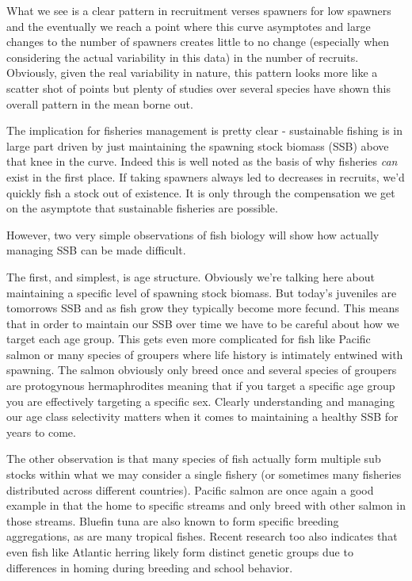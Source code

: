 \documentclass[11pt]{article}
\begin{document}
What we see is a clear pattern in recruitment verses spawners for low spawners and the eventually we reach a point where this curve asymptotes and large changes to the number of spawners creates little to no change (especially when considering the actual variability in this data) in the number of recruits. Obviously, given the real variability in nature, this pattern looks more like a scatter shot of points but plenty of studies over several species have shown this overall pattern in the mean borne out. \newline

The implication for fisheries management is pretty clear - sustainable fishing is in large part driven by just maintaining the spawning stock biomass (SSB) above that knee in the curve. Indeed this is well noted as the basis of why fisheries \textit{can} exist in the first place. If taking spawners always led to decreases in recruits, we'd quickly fish a stock out of existence. It is only through the compensation we get on the asymptote that sustainable fisheries are possible. \newline

However, two very simple observations of fish biology will show how actually managing SSB can be made difficult.

The first, and simplest, is age structure. Obviously we're talking here about maintaining a specific level of spawning stock biomass. But today's juveniles are tomorrows SSB and as fish grow they typically become more fecund. This means that in order to maintain our SSB over time we have to be careful about how we target each age group. This gets even more complicated for fish like Pacific salmon or many species of groupers where life history is intimately entwined with spawning. The salmon obviously only breed once and several species of groupers are protogynous hermaphrodites meaning that if you target a specific age group you are effectively targeting a specific sex. Clearly understanding and managing our age class selectivity matters when it comes to maintaining a healthy SSB for years to come. \newline

The other observation is that many species of fish actually form multiple sub stocks within what we may consider a single fishery (or sometimes many fisheries distributed across different countries). Pacific salmon are once again a good example in that the home to specific streams and only breed with other salmon in those streams. Bluefin tuna are also known to form specific breeding aggregations, as are many tropical fishes. Recent research too also indicates that even fish like Atlantic herring likely form distinct genetic groups due to differences in homing during breeding and school behavior. 
\end{document}
